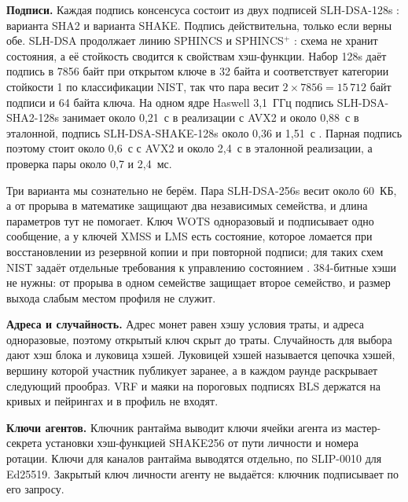 \documentclass[10pt,a4paper]{article}
\begin{document}
\textbf{Подписи.}
Каждая подпись консенсуса состоит из двух подписей SLH-DSA-128s \cite{fips205}: варианта SHA2 и варианта SHAKE.
Подпись действительна, только если верны обе.
SLH-DSA продолжает линию SPHINCS и SPHINCS$^+$ \cite{sphincs,sphincsplus}: схема не хранит состояния, а её стойкость сводится к свойствам хэш-функции.
Набор 128s даёт подпись в 7856 байт при открытом ключе в 32 байта и соответствует категории стойкости 1 по классификации NIST, так что пара весит $2\times7856=15\,712$ байт подписи и 64 байта ключа.
На одном ядре Haswell 3,1~ГГц подпись SLH-DSA-SHA2-128s занимает около 0,21~с в реализации с AVX2 и около 0,88~с в эталонной, подпись SLH-DSA-SHAKE-128s около 0,36 и 1,51~с \cite{sphincsr3}.
Парная подпись поэтому стоит около 0,6~с с AVX2 и около 2,4~с в эталонной реализации, а проверка пары около 0,7 и 2,4~мс.

Три варианта мы сознательно не берём.
Пара SLH-DSA-256s весит около 60~КБ, а от прорыва в математике защищают два независимых семейства, и длина параметров тут не помогает.
Ключ WOTS одноразовый и подписывает одно сообщение, а у ключей XMSS и LMS \cite{xmss,rfc8391,rfc8554} есть состояние, которое ломается при восстановлении из резервной копии и при повторной подписи; для таких схем NIST задаёт отдельные требования к управлению состоянием \cite{sp800208}.
384-битные хэши не нужны: от прорыва в одном семействе защищает второе семейство, и размер выхода слабым местом профиля не служит.

\textbf{Адреса и случайность.}
Адрес монет равен хэшу условия траты, и адреса одноразовые, поэтому открытый ключ скрыт до траты.
Случайность для выбора дают хэш блока и луковица хэшей.
Луковицей хэшей называется цепочка хэшей, вершину которой участник публикует заранее, а в каждом раунде раскрывает следующий прообраз.
VRF \cite{vrf} и маяки на пороговых подписях BLS держатся на кривых и пейрингах и в профиль не входят.

\textbf{Ключи агентов.}
Ключник рантайма выводит ключи ячейки агента из мастер-секрета установки хэш-функцией SHAKE256 от пути личности и номера ротации.
Ключи для каналов рантайма выводятся отдельно, по SLIP-0010 \cite{slip10} для Ed25519.
Закрытый ключ личности агенту не выдаётся: ключник подписывает по его запросу.
\end{document}
